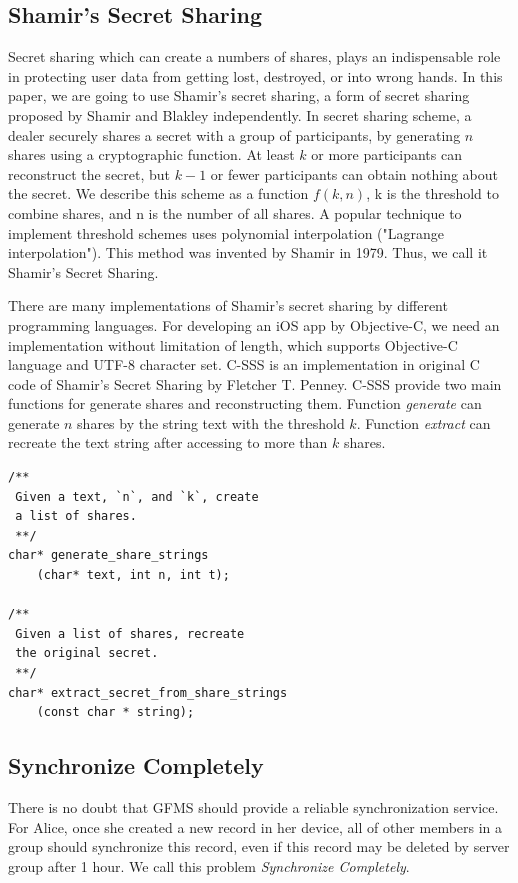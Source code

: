 \documentclass[twocolumn,10pt]{article}
\begin{document}
\subsection{Shamir's Secret Sharing}
Secret sharing which can create a numbers of shares, plays an indispensable role in protecting user data from getting lost, destroyed, or into wrong hands. In this paper, we are going to use Shamir's secret sharing, a form of secret sharing proposed by Shamir and Blakley independently. In secret sharing scheme, a dealer securely shares a secret with a group of participants, by generating $n$ shares using a cryptographic function\cite{smith2013layered}. At least $k$ or more participants can reconstruct the secret, but $k-1$ or fewer participants can obtain nothing about the secret\cite{pang2005new}. We describe this scheme as a function $f(k, n)$, k is the threshold to combine shares, and n is the number of all shares. A popular technique to implement threshold schemes uses polynomial interpolation ("Lagrange interpolation"). This method was invented by Shamir in 1979. Thus, we call it Shamir's Secret Sharing.

There are many implementations of Shamir's secret sharing by different programming languages. For developing an iOS app by Objective-C, we need an implementation without limitation of length, which supports Objective-C language and UTF-8 character set. C-SSS\cite{c-sss} is an implementation in original C code of Shamir's Secret Sharing by Fletcher T. Penney. C-SSS provide two main functions for generate shares and reconstructing them. Function \emph{generate} can generate $n$ shares by the string text with the threshold $k$. Function \emph{extract} can recreate the text string after accessing to more than $k$ shares.

\begin{lstlisting}[language={[ANSI]C}, numberstyle=\tiny,keywordstyle=\color{blue!70},commentstyle=\color{red!50!green!50!blue!50},frame=shadowbox, rulesepcolor=\color{red!20!green!20!blue!20}]
/**
 Given a text, `n`, and `k`, create 
 a list of shares.
 **/
char* generate_share_strings
	(char* text, int n, int t);

/**
 Given a list of shares, recreate 
 the original secret.
 **/
char* extract_secret_from_share_strings
	(const char * string);
\end{lstlisting}

\subsection{Synchronize Completely}
There is no doubt that GFMS should provide a reliable synchronization service. For Alice, once she created a new record in her device, all of other members in a group should synchronize this record, even if this record may be deleted by server group after 1 hour. We call this problem \emph{Synchronize Completely}.
\end{document}
